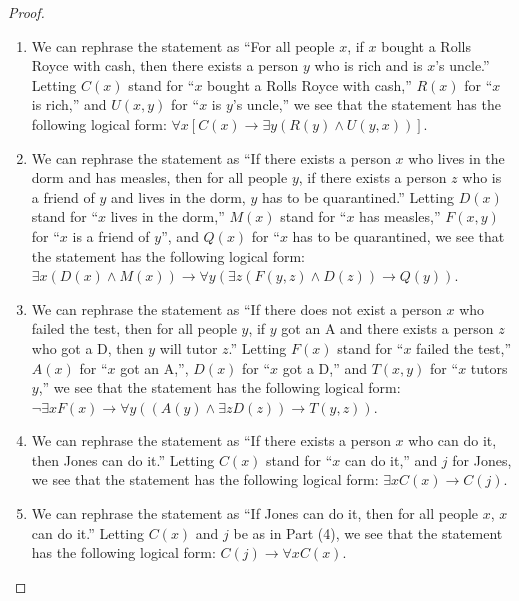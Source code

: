 \documentclass[12pt]{amsart}
\theoremstyle{definition}
\theoremstyle{remark}
\begin{document}
\begin{proof}
\hfill
\begin{enumerate}
	\item We can rephrase the statement as ``For all people $x$, if $x$ bought a Rolls Royce with cash, then there exists a person $y$ who is rich and is $x$'s uncle.''
	Letting $C(x)$ stand for ``$x$ bought a Rolls Royce with cash,'' $R(x)$ for ``$x$ is rich,'' and $U(x, y)$ for ``$x$ is $y$'s uncle,'' we see that the statement has the following logical form:
	$\forall x [C(x) \rightarrow \exists y (R(y) \wedge U(y, x))]$.
	
	\item We can rephrase the statement as ``If there exists a person $x$ who lives in the dorm and has measles, then for all people $y$, if there exists a person $z$ who is a friend of $y$ and lives in the dorm, $y$ has to be quarantined.''
	Letting $D(x)$ stand for ``$x$ lives in the dorm,'' $M(x)$ stand for ``$x$ has measles,'' $F(x, y)$ for ``$x$ is a friend of $y$'', and $Q(x)$ for ``$x$ has to be quarantined, we see that the statement has the following logical form:
	$\exists x (D(x) \wedge M(x)) \rightarrow \forall y (\exists z (F(y, z) \wedge D(z)) \rightarrow Q(y))$.
	
	\item We can rephrase the statement as ``If there does not exist a person $x$ who failed the test, then for all people $y$, if $y$ got an A and there exists a person $z$ who got a D, then $y$ will tutor $z$.''
	Letting $F(x)$ stand for ``$x$ failed the test,'' $A(x)$ for ``$x$ got an A,'', $D(x)$ for ``$x$ got a D,'' and $T(x, y)$ for ``$x$ tutors $y$,'' we see that the statement has the following logical form:
	$\neg \exists x F(x) \rightarrow \forall y ((A(y) \wedge \exists z D(z)) \rightarrow T(y, z))$.
	
	\item We can rephrase the statement as ``If there exists a person $x$ who can do it, then Jones can do it.''
	Letting $C(x)$ stand for ``$x$ can do it,'' and $j$ for Jones, we see that the statement has the following logical form:
	$\exists x C(x) \rightarrow C(j)$.
	
	\item We can rephrase the statement as ``If Jones can do it, then for all people $x$, $x$ can do it.''
	Letting $C(x)$ and $j$ be as in Part (4), we see that the statement has the following logical form:
	$C(j) \rightarrow \forall x C(x)$.
\end{enumerate}
\end{proof}
\end{document}
